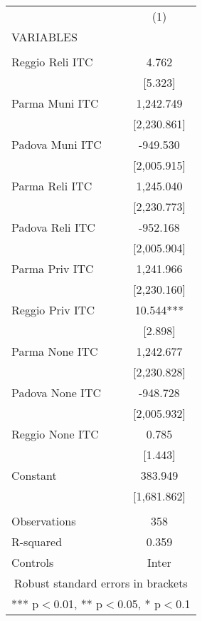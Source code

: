 \begin{tabular}{lc} \hline
 & (1) \\
VARIABLES &  \\ \hline
 &  \\
Reggio Reli ITC & 4.762 \\
 & [5.323] \\
Parma Muni ITC & 1,242.749 \\
 & [2,230.861] \\
Padova Muni ITC & -949.530 \\
 & [2,005.915] \\
Parma Reli ITC & 1,245.040 \\
 & [2,230.773] \\
Padova Reli ITC & -952.168 \\
 & [2,005.904] \\
Parma Priv ITC & 1,241.966 \\
 & [2,230.160] \\
Reggio Priv ITC & 10.544*** \\
 & [2.898] \\
Parma None ITC & 1,242.677 \\
 & [2,230.828] \\
Padova None ITC & -948.728 \\
 & [2,005.932] \\
Reggio None ITC & 0.785 \\
 & [1.443] \\
Constant & 383.949 \\
 & [1,681.862] \\
 &  \\
Observations & 358 \\
R-squared & 0.359 \\
 Controls & Inter \\ \hline
\multicolumn{2}{c}{ Robust standard errors in brackets} \\
\multicolumn{2}{c}{ *** p$<$0.01, ** p$<$0.05, * p$<$0.1} \\
\end{tabular}
